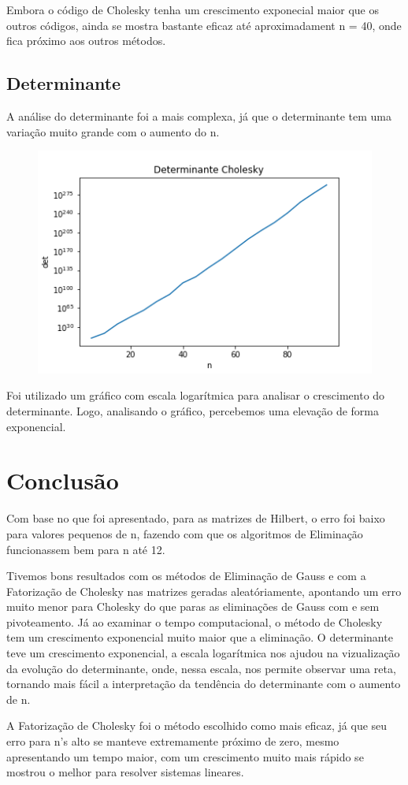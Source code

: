 \documentclass{article}
\begin{document}
Embora o código de Cholesky tenha um crescimento exponecial maior que os outros códigos, ainda se mostra bastante eficaz até aproximadament n = 40, onde fica próximo aos outros métodos.

\subsection{Determinante}

A análise do determinante foi a mais complexa, já que o determinante tem uma variação muito grande com o aumento do n.


\begin{figure}[!ht]
    \centering
    \includegraphics[scale=0.5]{det_cholesky1.png}
    \label{fig:my_label}
\end{figure}

Foi utilizado um gráfico com escala logarítmica para analisar o crescimento do determinante. Logo, analisando o gráfico, percebemos uma elevação de forma exponencial.

\hfill

\newpage

\section*{Conclusão}
Com base no que foi apresentado, para as matrizes de Hilbert, o erro foi baixo para valores pequenos de n, fazendo com que os algoritmos de Eliminação funcionassem bem para n até 12. 

\par Tivemos bons resultados com os métodos de Eliminação de Gauss e com a Fatorização de Cholesky nas matrizes geradas aleatóriamente, apontando um erro muito menor para Cholesky do que paras as eliminações de Gauss com e sem pivoteamento. Já ao examinar o tempo computacional, o método de Cholesky tem um crescimento exponencial muito maior que a eliminação. O determinante teve um crescimento exponencial, a escala logarítmica nos ajudou na vizualização da evolução do determinante, onde, nessa escala, nos permite observar uma reta, tornando mais fácil a interpretação da tendência do determinante com o aumento de n.

\par A Fatorização de Cholesky foi o método escolhido como mais eficaz, já que seu erro para n's alto se manteve extremamente próximo de zero, mesmo apresentando um tempo maior, com um crescimento muito mais rápido se mostrou o melhor para resolver sistemas lineares.
\end{document}
